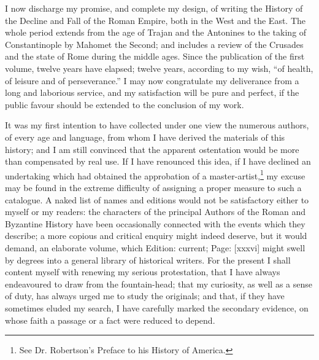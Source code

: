 
I now discharge my promise, and complete my design, of writing the History of the Decline and Fall of the Roman Empire, both in the West and the East. The whole period extends from the age of Trajan and the Antonines to the taking of Constantinople by Mahomet the Second; and includes a review of the Crusades and the state of Rome during the middle ages. Since the publication of the first volume, twelve years have elapsed; twelve years, according to my wish, \texthebrew{“}of health, of leisure and of perseverance.\texthebrew{}” I may now congratulate my deliverance from a long and laborious service, and my satisfaction will be pure and perfect, if the public favour should be extended to the conclusion of my work.

It was my first intention to have collected under one view the numerous authors, of every age and language, from whom I have derived the materials of this history; and I am still convinced that the apparent ostentation would be more than compensated by real use. If I have renounced this idea, if I have declined an undertaking which had obtained the approbation of a master-artist,\footnote{See Dr. Robertson\texthebrew{}’s Preface to his History of America.} my excuse may be found in the extreme difficulty of assigning a proper measure to such a catalogue. A naked list of names and editions would not be satisfactory either to myself or my readers: the characters of the principal Authors of the Roman and Byzantine History have been occasionally connected with the events which they describe; a more copious and critical enquiry might indeed deserve, but it would demand, an elaborate volume, which Edition: current; Page: [xxxvi] might swell by degrees into a general library of historical writers. For the present I shall content myself with renewing my serious protestation, that I have always endeavoured to draw from the fountain-head; that my curiosity, as well as a sense of duty, has always urged me to study the originals; and that, if they have sometimes eluded my search, I have carefully marked the secondary evidence, on whose faith a passage or a fact were reduced to depend.

